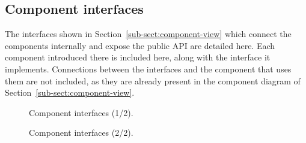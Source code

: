 \subsection{Component interfaces}
The interfaces shown in Section~\ref{sub-sect:component-view}  which connect the components internally and expose the public API are detailed here. Each component introduced there is included here, along with the interface it implements. Connections between the interfaces and the component that uses them are not included, as they are already present in the component diagram of Section~\ref{sub-sect:component-view}.

\begin{figure}[H]
    \centering
    \caption{\label{fig:interfaces-1}Component interfaces (1/2).}
\end{figure}

\begin{figure}[H]
    \centering
    \caption{\label{fig:interfaces-2}Component interfaces (2/2).}
\end{figure}

